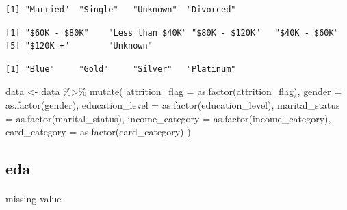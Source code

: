 \documentclass[
  letterpaper,
  DIV=11,
  numbers=noendperiod]{scrartcl}
\makeatletter
\let\oldparagraph\paragraph
\renewcommand{\paragraph}{
    \@ifstar
      \xxxParagraphStar
      \xxxParagraphNoStar
  }
\newcommand{\xxxParagraphStar}[1]{\oldparagraph*{#1}\mbox{}}
\newcommand{\xxxParagraphNoStar}[1]{\oldparagraph{#1}\mbox{}}
\newenvironment{Shaded}{\begin{snugshade}}{\end{snugshade}}
\newcommand{\AttributeTok}[1]{\textcolor[rgb]{0.40,0.45,0.13}{#1}}
\newcommand{\FunctionTok}[1]{\textcolor[rgb]{0.28,0.35,0.67}{#1}}
\newcommand{\NormalTok}[1]{\textcolor[rgb]{0.00,0.23,0.31}{#1}}
\newcommand{\OtherTok}[1]{\textcolor[rgb]{0.00,0.23,0.31}{#1}}
\newcommand{\SpecialCharTok}[1]{\textcolor[rgb]{0.37,0.37,0.37}{#1}}
\makeatother
\begin{document}
\begin{verbatim}
[1] "Married"  "Single"   "Unknown"  "Divorced"
\end{verbatim}

\begin{Shaded}
\end{Shaded}

\begin{verbatim}
[1] "$60K - $80K"    "Less than $40K" "$80K - $120K"   "$40K - $60K"   
[5] "$120K +"        "Unknown"       
\end{verbatim}

\begin{Shaded}
\end{Shaded}

\begin{verbatim}
[1] "Blue"     "Gold"     "Silver"   "Platinum"
\end{verbatim}

\begin{Shaded}
\begin{Highlighting}[]
\NormalTok{data }\OtherTok{\textless{}{-}}\NormalTok{ data }\SpecialCharTok{\%\textgreater{}\%} 
  \FunctionTok{mutate}\NormalTok{(}
    \AttributeTok{attrition\_flag =} \FunctionTok{as.factor}\NormalTok{(attrition\_flag),}
    \AttributeTok{gender =} \FunctionTok{as.factor}\NormalTok{(gender),}
    \AttributeTok{education\_level =} \FunctionTok{as.factor}\NormalTok{(education\_level),}
    \AttributeTok{marital\_status =} \FunctionTok{as.factor}\NormalTok{(marital\_status),}
    \AttributeTok{income\_category =} \FunctionTok{as.factor}\NormalTok{(income\_category),}
    \AttributeTok{card\_category =} \FunctionTok{as.factor}\NormalTok{(card\_category)}
\NormalTok{  )}
\end{Highlighting}
\end{Shaded}

\subsection{eda}\label{eda}

\paragraph{missing value}\label{missing-value}
\end{document}
